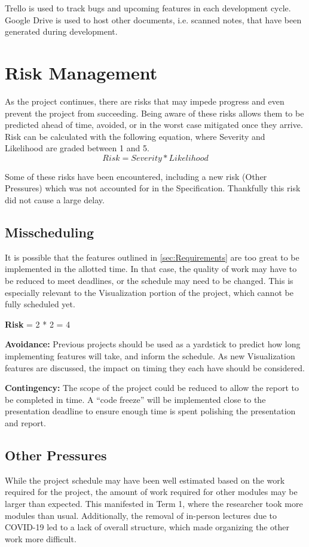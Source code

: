 Trello\cite{tool:Trello} is used to track bugs and upcoming features in each development cycle.
Google Drive\cite{tool:GoogleDrive} is used to host other documents, i.e. scanned notes, that have been generated during development.

\section{Risk Management}
As the project continues, there are risks that may impede progress and even prevent the project from succeeding.
Being aware of these risks allows them to be predicted ahead of time, avoided, or in the worst case mitigated once they arrive.
Risk can be calculated with the following equation, where Severity and Likelihood are graded between 1 and 5.
\begin{equation*}
    Risk = Severity * Likelihood
\end{equation*}

Some of these risks have been encountered, including a new risk (Other Pressures) which was not accounted for in the Specification.
Thankfully this risk did not cause a large delay.

\subsection{Misscheduling}
It is possible that the features outlined in \cref{sec:Requirements} are too great to be implemented in the allotted time.
In that case, the quality of work may have to be reduced to meet deadlines, or the schedule may need to be changed.
This is especially relevant to the Visualization portion of the project, which cannot be fully scheduled yet.

\textbf{Risk} = 2 * 2 = 4

\textbf{Avoidance:}
Previous projects should be used as a yardstick to predict how long implementing features will take, and inform the schedule.
As new Visualization features are discussed, the impact on timing they each have should be considered.

\textbf{Contingency:}
The scope of the project could be reduced to allow the report to be completed in time.
A ``code freeze'' will be implemented close to the presentation deadline to ensure enough time is spent polishing the presentation and report.

\subsection{Other Pressures}
While the project schedule may have been well estimated based on the work required for the project, the amount of work required for other modules may be larger than expected.
This manifested in Term 1, where the researcher took more modules than usual. 
Additionally, the removal of in-person lectures due to COVID-19 led to a lack of overall structure, which made organizing the other work more difficult.

